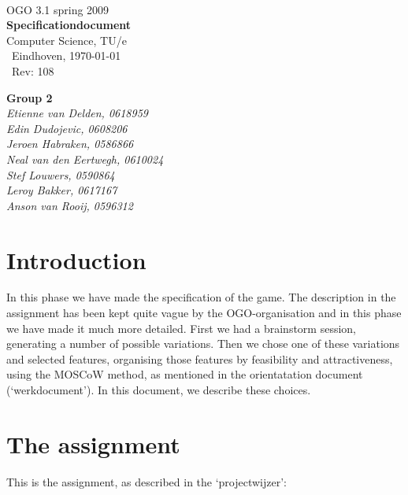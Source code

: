 \documentclass[a4paper,twoside,11pt]{report}
\begin{document}
   \begin{titlepage}
        {\ }\\[5.0cm]
        { {\Large OGO 3.1 spring 2009}}\\[0.2cm]
        {\bf \Huge Specificationdocument}\\[0.1cm]
        { {\Large {Computer Science, TU/e} }}\\[1.0cm]
        {\ Eindhoven, \today }\\[0.2cm]
        {\ $ $Rev: 108 $ $ }\\[0.2cm]
        \begin{flushright}
            {\bf {\small Group 2 }}\\[0.0cm]
            {\em {\small Etienne van Delden, 0618959}}\\
            {\em {\small Edin Dudojevic, 0608206}}\\
            {\em {\small Jeroen Habraken, 0586866}}\\
            {\em {\small Neal van den Eertwegh, 0610024 }}\\
            {\em {\small Stef Louwers, 0590864}}\\
            {\em {\small Leroy Bakker, 0617167}}\\
            {\em {\small Anson van Rooij, 0596312}}\\[0.5cm]
        \end{flushright}
    \end{titlepage}
    \tableofcontents
    \newpage

\chapter{Introduction}
In this phase we have made the specification of the game. The description in the assignment has been kept quite vague by the OGO-organisation and in this phase we have made it much more detailed. First we had a brainstorm session, generating a number of possible variations. Then we chose one of these variations and selected features, organising those features by feasibility and attractiveness, using the MOSCoW method, as mentioned in the orientatation document (`werkdocument'). In this document, we describe these choices.

\chapter{The assignment}
This is the assignment, as described in the `projectwijzer':
\end{document}
